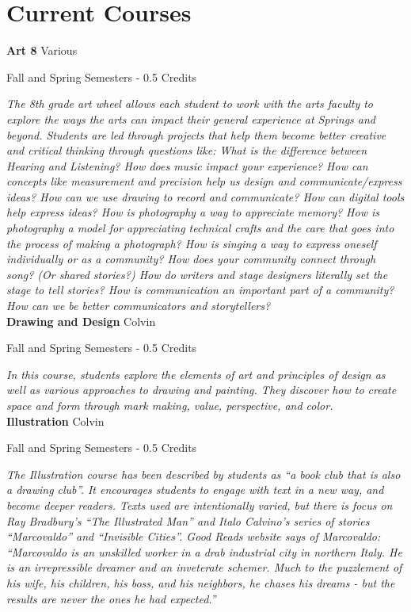 \section{Current Courses}

\noindent\textbf{Art 8} \hfill Various

\noindent Fall and Spring Semesters - 0.5 Credits

\vspace{1mm}\emph{The 8th grade art wheel allows each student to work with the arts faculty to explore the ways the arts can impact their general experience at Springs and beyond. Students are led through projects that help them become better creative and critical thinking through questions like: What is the difference between Hearing and Listening? How does music impact your experience? How can concepts like measurement and precision help us design and communicate/express ideas? How can we use drawing to record and communicate? How can digital tools help express ideas? How is photography a way to appreciate memory? How is photography a model for appreciating technical crafts and the care that goes into the process of making a photograph? How is singing a way to express oneself individually or as a community? How does your community connect through song? (Or shared stories?) How do writers and stage designers literally set the stage to tell stories? How is communication an important part of a community? How can we be better communicators and storytellers?}\\


\noindent\textbf{Drawing and Design} \hfill Colvin

\noindent Fall and Spring Semesters - 0.5 Credits

\vspace{1mm}\emph{In this course, students explore the elements of art and principles of design as well as various approaches to drawing and painting. They discover how to create space and form through mark making, value, perspective, and color.}\\


\noindent\textbf{Illustration} \hfill Colvin

\noindent Fall and Spring Semesters - 0.5 Credits

\vspace{1mm}\emph{The Illustration course has been described by students as “a book club that is also a drawing club”. It encourages students to engage with text in a new way, and become deeper readers. Texts used are intentionally varied, but there is focus on Ray Bradbury’s “The Illustrated Man” and Italo Calvino’s series of stories “Marcovaldo” and “Invisible Cities”. Good Reads website says of Marcovaldo: “Marcovaldo is an unskilled worker in a drab industrial city in northern Italy. He is an irrepressible dreamer and an inveterate schemer. Much to the puzzlement of his wife, his children, his boss, and his neighbors, he chases his dreams - but the results are never the ones he had expected.”}\\


